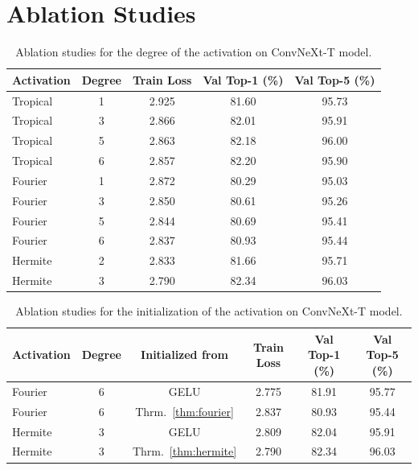 \documentclass{article} %
\theoremstyle{plain}
\theoremstyle{definition}
\theoremstyle{remark}
\begin{document}
\section{Ablation Studies}
\label{appendix:ablations}
\begin{table}[!htbp]
\caption{Ablation studies for the degree of the activation on ConvNeXt-T model.}
\label{res:ablation_degree}
\begin{center}
\begin{small}
\begin{tabular}{lcccc}
\toprule
\textbf{Activation} & \textbf{Degree} & \textbf{Train Loss} & \textbf{Val Top-1 (\%)} & \textbf{Val Top-5 (\%)}\\
\midrule
Tropical & 1 & 2.925 & 81.60 & 95.73 \\
Tropical & 3 & 2.866 & 82.01 & 95.91 \\
Tropical & 5 & 2.863 & 82.18 & 96.00 \\
Tropical & 6 & 2.857 & 82.20 & 95.90 \\
\midrule
Fourier & 1 & 2.872 & 80.29 & 95.03 \\
Fourier & 3 & 2.850 & 80.61 & 95.26 \\
Fourier & 5 & 2.844 & 80.69 & 95.41 \\
Fourier & 6 & 2.837 & 80.93 & 95.44 \\
\midrule
Hermite & 2 & 2.833 & 81.66 & 95.71 \\
Hermite & 3 & 2.790 & 82.34 & 96.03 \\
\bottomrule
\end{tabular}
\end{small}
\end{center}
\end{table}
\begin{table}[!htbp]
\caption{Ablation studies for the initialization of the activation on ConvNeXt-T model.}
\label{res:ablation_init}
\begin{center}
\begin{small}
\begin{tabular}{lccccc}
\toprule
\textbf{Activation} & \textbf{Degree} & \textbf{Initialized from}  & \textbf{Train Loss} & \textbf{Val Top-1 (\%)} & \textbf{Val Top-5 (\%)}\\
\midrule
Fourier & 6 & GELU  & 2.775 & 81.91 & 95.77 \\
Fourier & 6 & Thrm.~\ref{thm:fourier} & 2.837 & 80.93 & 95.44 \\
\midrule
Hermite & 3 & GELU & 2.809 & 82.04 & 95.91 \\
Hermite & 3 & Thrm.~\ref{thm:hermite} & 2.790 & 82.34 & 96.03 \\
\bottomrule
\end{tabular}
\end{small}
\end{center}
\end{table}
\end{document}
